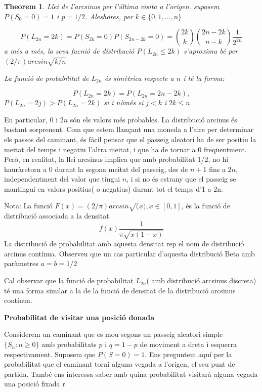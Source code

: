 \documentclass[
  catalan,
]{article}
\newtheorem{theorem}{Theorem}[section]
\theoremstyle{definition}
\theoremstyle{definition}
\theoremstyle{definition}
\theoremstyle{definition}
\theoremstyle{remark}
\begin{document}
\begin{theorem}
\emph{Llei de l'arcsinus per l'última visita a l'origen}. suposem \(P(S_0=0)=1\) i \(p=1/2\). Aleshores, per \(k \in \{0,1,\dots,n \}\)

\[
P(L_{2n}=2k)=P(S_{2k}=0)P(S_{2n-2k}=0)=\binom{2k}{k}\binom{2n-2k}{n-k}\dfrac{1}{2^{2n}} \label{eq:arcsinus} 
\]
a més a més, la seva fucnió de distribució \(P(L_{2n}\leq 2k)\) s'aproxima bé per \((2/\pi)arcsin \sqrt{k/n}\)

La funció de probabilitat de \(L_{2n}\) és simètrica respecte a \(n\) i té la forma:

\[
P(L_{2n} =2k)=P(L_{2n}=2n-2k),
\]
\(P(L_{2n}=2j)>P(L_{2n}=2k)\) si i nòmés si \(j<k\) i \(2k\leq n\)
\end{theorem}

En particular, \(0\) i \(2n\) són els valors més probables. La distribució arcinus és bastant sorprenent. Com que estem llançant una moneda a l'aire per determinar els passos del caminant, és fàcil pensar que el passeig aleatori ha de ser positiu la meitat del temps i negatiu l'altra meitat, i que ha de tornar a 0 freqüentment. Però, en realitat, la llei arcsinus implica que amb probabilitat 1/2, no hi hauràretorn a 0 durant la segona meitat del passeig, des de \(n+1\) fins a \(2n\), independentment del valor que tingui \(n\), i si no és estrany que el passeig se mantingui en valors positius( o negatius) durant tot el temps d'1 a 2n.

Nota: La funció \(F(x)=(2/\pi)arcsin \sqrt(x), x \in [0,1]\), és la funció de distribució associada a la densitat
\[
f(x)\dfrac {1}{\pi \sqrt{x(1-x)}}
\]
La distribució de probabilitat amb aquesta densitat rep el nom de distribució arcinus contínua. Observeu que un cas particular d'aquesta distribució Beta amb paràmetres \(a=b=1/2\)

Cal observar que la funció de probabilitat \(L_{2n}\)( amb distribució arcsinus discreta) té una forma similar a la de la funció de densitat de la distribució arcsinus contínua.

\textbf{Probabilitat de visitar una posició donada}

Considerem un caminant que es mou segons un passeig aleatori simple \(\{S_n: n \geq 0\}\) amb probabilitats \(p\) i \(q=1-p\) de moviment a dreta i esquerra respectivament. Suposem que \(P(S=0)=1\). Ens preguntem aquí per la probabilitat que el caminant torni alguna vegada a l'origen, el seu punt de partida. També ens interessa saber amb quina probabilitat visitarà alguna vegada una posició fixada r
\end{document}
